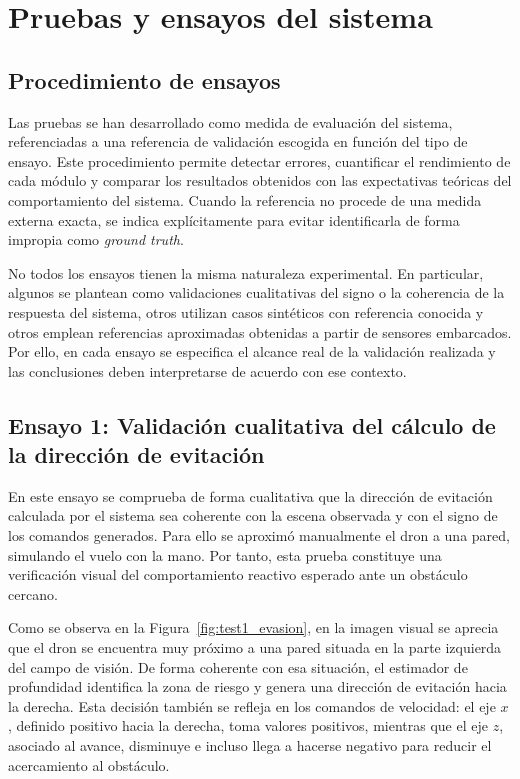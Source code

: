 \chapter{Pruebas y ensayos del sistema}

\section{Procedimiento de ensayos}
Las pruebas se han desarrollado como medida de evaluaci\'on del sistema, referenciadas a una referencia de validaci\'on escogida en funci\'on del tipo de ensayo. Este procedimiento permite detectar errores, cuantificar el rendimiento de cada m\'odulo y comparar los resultados obtenidos con las expectativas te\'oricas del comportamiento del sistema. Cuando la referencia no procede de una medida externa exacta, se indica expl\'icitamente para evitar identificarla de forma impropia como \textit{ground truth}.

No todos los ensayos tienen la misma naturaleza experimental. En particular, algunos se plantean como validaciones cualitativas del signo o la coherencia de la respuesta del sistema, otros utilizan casos sint\'eticos con referencia conocida y otros emplean referencias aproximadas obtenidas a partir de sensores embarcados. Por ello, en cada ensayo se especifica el alcance real de la validaci\'on realizada y las conclusiones deben interpretarse de acuerdo con ese contexto.

\section{Ensayo 1: Validaci\'on cualitativa del c\'alculo de la direcci\'on de evitaci\'on}
En este ensayo se comprueba de forma cualitativa que la direcci\'on de evitaci\'on calculada por el sistema sea coherente 
con la escena observada y con el signo de los comandos generados. Para ello se aproxim\'o manualmente el dron a una pared, simulando 
el vuelo con la mano. Por tanto, esta prueba constituye una verificaci\'on visual del comportamiento reactivo esperado ante un obst\'aculo cercano.

Como se observa en la Figura~\ref{fig:test1_evasion}, en la imagen visual se aprecia que el dron se encuentra muy 
pr\'oximo a una pared situada en la parte izquierda del campo de visi\'on. De forma coherente con esa situaci\'on, el 
estimador de profundidad identifica la zona de riesgo y genera una direcci\'on de evitaci\'on hacia la derecha. Esta 
decisi\'on tambi\'en se refleja en los comandos de velocidad: el eje \(x\), definido positivo hacia la derecha, toma 
valores positivos, mientras que el eje \(z\), asociado al avance, disminuye e incluso llega a hacerse negativo para 
reducir el acercamiento al obst\'aculo.

